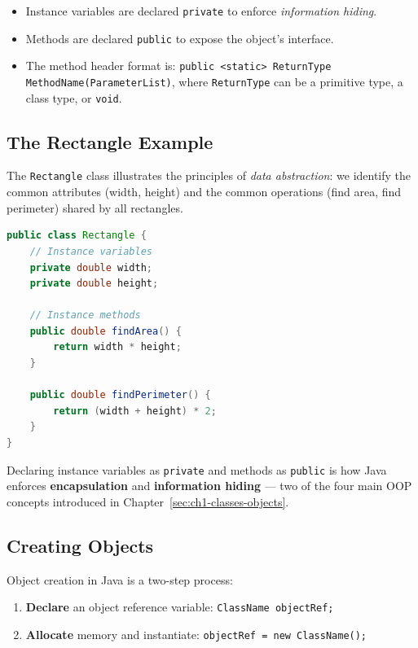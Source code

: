 \documentclass[11pt, a4paper, notitlepage]{report}
\theoremstyle{definition}
\theoremstyle{remark}
\theoremstyle{definition}
\begin{document}
\begin{itemize}
  \item Instance variables are declared \texttt{private} to enforce \emph{information hiding}.
  \item Methods are declared \texttt{public} to expose the object's interface.
  \item The method header format is: \texttt{public <static> ReturnType MethodName(ParameterList)}, where \texttt{ReturnType} can be a primitive type, a class type, or \texttt{void}.
\end{itemize}

\subsection{The Rectangle Example}
\label{sec:ch2-rectangle}

The \texttt{Rectangle} class illustrates the principles of \emph{data abstraction}: we identify the common attributes (width, height) and the common operations (find area, find perimeter) shared by all rectangles.

\begin{lstlisting}[language=Java, caption={Rectangle class definition}]
public class Rectangle {
    // Instance variables
    private double width;
    private double height;

    // Instance methods
    public double findArea() {
        return width * height;
    }

    public double findPerimeter() {
        return (width + height) * 2;
    }
}
\end{lstlisting}

\begin{keyresult}[title={Key Result: Class and OOP Principles}]
Declaring instance variables as \texttt{private} and methods as \texttt{public} is how Java enforces \textbf{encapsulation} and \textbf{information hiding} --- two of the four main OOP concepts introduced in Chapter~\ref{sec:ch1-classes-objects}.
\end{keyresult}

\subsection{Creating Objects}
\label{sec:ch2-creating-objects}

Object creation in Java is a two-step process:

\begin{enumerate}
  \item \textbf{Declare} an object reference variable: \quad \texttt{ClassName objectRef;}
  \item \textbf{Allocate} memory and instantiate: \quad \texttt{objectRef = new ClassName();}
\end{enumerate}
\end{document}

